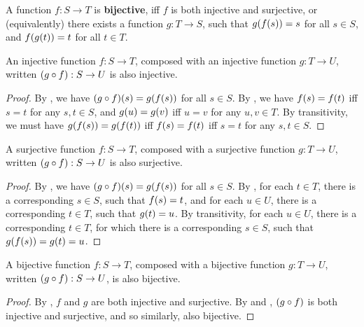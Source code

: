 \begin{definition} \label{def:bijective} A function $f : S \rightarrow T$ is
\textbf{bijective}, iff $f$ is both injective and surjective, or (equivalently)
there exists a function $g : T \rightarrow S$, such that $g\p{f\p{s}}=s$ for
all $s\in S$, and $f\p{g\p{t}}=t$ for all $t\in T$.\end{definition}

\begin{theorem} \label{thm:injective-compose} An injective function $f : S
\rightarrow T$, composed with an injective function $g : T \rightarrow U$,
written $\p{g \circ f} : S \rightarrow U$ is also injective. \end{theorem}

\begin{proof} By , we have $\p{g \circ f}\p{s}=g\p{f\p{s}}$ for
all $s \in S$. By , we have $f\p{s}=f\p{t}$ iff $s=t$ for any
$s,t\in S$, and $g\p{u}=g\p{v}$ iff $u=v$ for any $u,v \in T$. By transitivity,
we must have $g\p{f\p{s}}=g\p{f\p{t}}$ iff $f\p{s}=f\p{t}$ iff $s=t$ for any
$s,t \in S$.\end{proof}

\begin{theorem} \label{thm:surjective-compose} A surjective function $f : S
\rightarrow T$, composed with a surjective function $g : T \rightarrow U$,
written $\p{g \circ f} : S \rightarrow U$ is also surjective. \end{theorem}

\begin{proof} By , we have $\p{g \circ f}\p{s}=g\p{f\p{s}}$ for
all $s \in S$. By , for each $t \in T$, there is a
corresponding $s \in S$, such that $f\p{s} = t$, and for each $u \in U$, there
is a corresponding $t \in T$, such that $g\p{t} = u$. By transitivity, for each
$u \in U$, there is a corresponding $t \in T$, for which there is a
corresponding $s \in S$, such that $g\p{f\p{s}} = g\p{t} = u$.\end{proof}

\begin{theorem} \label{thm:bijective-compose} A bijective function $f : S
\rightarrow T$, composed with a bijective function $g : T \rightarrow U$,
written $\p{g \circ f} : S \rightarrow U$, is also bijective.
\end{theorem}

\begin{proof} By , $f$ and $g$ are both injective and
surjective. By  and ,
$\p{g \circ f}$ is both injective and surjective, and so similarly, also
bijective. \end{proof}

